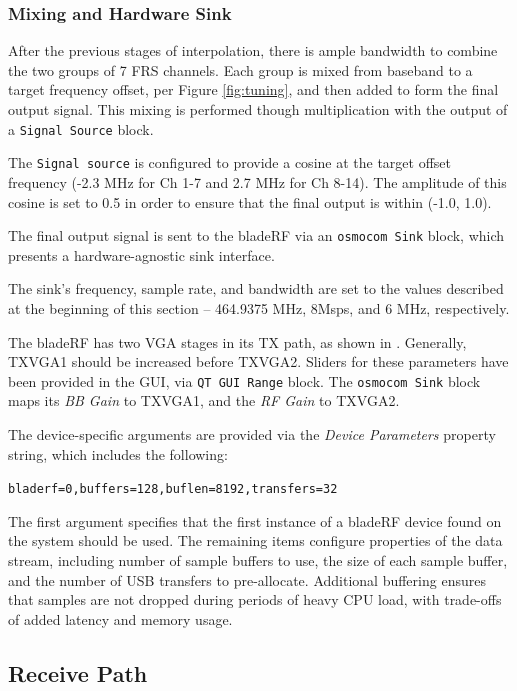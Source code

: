\subsubsection{Mixing and Hardware Sink}

After the previous stages of interpolation, there is ample bandwidth to combine
the two groups of 7 \ac{FRS} channels. Each group is mixed from baseband to
a target frequency offset, per Figure \ref{fig:tuning}, and then added to form
the final output signal. This mixing is performed though multiplication with
the output of a \texttt{Signal Source} block.

The \texttt{Signal source} is configured to provide a cosine at the target
offset frequency (-2.3 MHz for Ch 1-7 and 2.7 MHz for Ch 8-14). The amplitude
of this cosine is set to 0.5 in order to ensure that the final output is within
(-1.0, 1.0).

The final output signal is sent to the bladeRF via an \texttt{osmocom Sink}
block, which presents a hardware-agnostic sink interface. 

The sink's frequency, sample rate, and bandwidth are set to the values
described at the beginning of this section -- 464.9375 MHz, 8Msps, and 6 MHz,
respectively.

The bladeRF has two \ac{VGA} stages in its \ac{TX} path, as shown in
\cite{LMS6002D_DATASHEET}. Generally, TXVGA1 should be increased before
TXVGA2. Sliders for these parameters have been provided in the \ac{GUI}, via
\texttt{QT GUI Range} block. The \texttt{osmocom Sink} block maps its
\textit{BB Gain} to TXVGA1, and the \textit{RF Gain} to TXVGA2.

The device-specific arguments are provided via the \textit{Device Parameters}
property string, which includes the following:

\begin{center}
  \texttt{bladerf=0,buffers=128,buflen=8192,transfers=32}
\end{center}

The first argument specifies that the first instance of a bladeRF device found
on the system should be used. The remaining items configure properties of the
data stream, including number of sample buffers to use, the size of each sample
buffer, and the number of USB transfers to pre-allocate. Additional buffering
ensures that samples are not dropped during periods of heavy CPU load, with
trade-offs of added latency and memory usage.

\newpage
\subsection{Receive Path}

